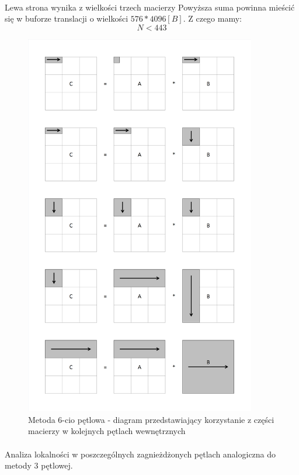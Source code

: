 \documentclass{scrartcl}
\begin{document}
\paragraph{}Lewa strona wynika z wielkości trzech macierzy Powyższa suma powinna mieścić się w buforze translacji o wielkości $576 * 4096[B]$. Z czego mamy:
\begin{equation}
N < 443
\end{equation}
\begin{figure}[H]
\includegraphics[width=0.9\textwidth]{6petlowa.png}
\caption{Metoda 6-cio pętlowa - diagram przedstawiający korzystanie z części macierzy w kolejnych pętlach wewnętrznych}
\end{figure}
\paragraph{}Analiza lokalności w poszczególnych zagnieżdżonych pętlach analogiczna do metody 3 pętlowej.
\end{document}
